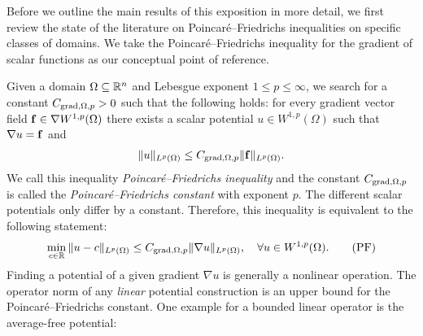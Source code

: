 \documentclass[10pt,letterpaper]{article}
\begin{document}
Before we outline the main results of this exposition in more detail, 
we first review the state of the literature on Poincar\'e--Friedrichs inequalities on specific classes of domains. 
We take the Poincar\'e--Friedrichs inequality for the gradient of scalar functions as our conceptual point of reference.

Given a domain $\Omega \subseteq {\mathbb R}^{n}$ and Lebesgue exponent $1 \leq p \leq \infty$,
we search for a constant $C_{\operatorname{grad},\Omega,p} > 0$ such that the following holds:
for every gradient vector field ${\mathbf f} \in \nabla W^{1,p}(\Omega)$ there exists a scalar potential $u \in W^{1,p}(\Omega)$
such that $\nabla u = {\mathbf f}$ and 
\begin{align}\label{math:intro:inequalitypf:gradient}
    \| u \|_{L^{p}(\Omega)}
    \leq 
    C_{\operatorname{grad},\Omega,p} 
    \| {\mathbf f} \|_{L^{p}(\Omega)}
    .
\end{align}
We call this inequality \emph{Poincar\'e--Friedrichs inequality} and the constant $C_{\operatorname{grad},\Omega,p}$ is called the \emph{Poincar\'e--Friedrichs constant} with exponent $p$. 
The different scalar potentials only differ by a constant. 
Therefore, %
this inequality is equivalent to the following statement: 
\begin{align}\label{math:intro:poincarefriedrichs:grad}
    \min\limits_{c\in\bbR}
    \| u - c \|_{L^{p}(\Omega)}
    \leq 
    C_{\grad,\Omega,p} \| \nabla u \|_{L^{p}(\Omega)},
    \quad 
    \forall
    u \in W^{1,p}(\Omega) %
    .\tag{PF} 
\end{align}
Finding a potential of a given gradient $\nabla u$ is generally a nonlinear operation. 
The operator norm of any \emph{linear} potential construction is an upper bound for the Poincar\'e--Friedrichs constant. 
One example for a bounded linear operator is the average-free potential:
\end{document}
